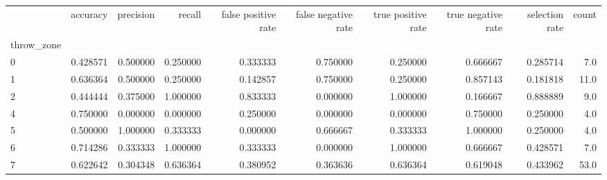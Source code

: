 \begin{tabular}{lrrrrrrrrr}
\toprule
{} &  accuracy &  precision &    recall &  false positive rate &  false negative rate &  true positive rate &  true negative rate &  selection rate &  count \\
throw\_zone &           &            &           &                      &                      &                     &                     &                 &        \\
\midrule
0          &  0.428571 &   0.500000 &  0.250000 &             0.333333 &             0.750000 &            0.250000 &            0.666667 &        0.285714 &    7.0 \\
1          &  0.636364 &   0.500000 &  0.250000 &             0.142857 &             0.750000 &            0.250000 &            0.857143 &        0.181818 &   11.0 \\
2          &  0.444444 &   0.375000 &  1.000000 &             0.833333 &             0.000000 &            1.000000 &            0.166667 &        0.888889 &    9.0 \\
4          &  0.750000 &   0.000000 &  0.000000 &             0.250000 &             0.000000 &            0.000000 &            0.750000 &        0.250000 &    4.0 \\
5          &  0.500000 &   1.000000 &  0.333333 &             0.000000 &             0.666667 &            0.333333 &            1.000000 &        0.250000 &    4.0 \\
6          &  0.714286 &   0.333333 &  1.000000 &             0.333333 &             0.000000 &            1.000000 &            0.666667 &        0.428571 &    7.0 \\
7          &  0.622642 &   0.304348 &  0.636364 &             0.380952 &             0.363636 &            0.636364 &            0.619048 &        0.433962 &   53.0 \\
\bottomrule
\end{tabular}
